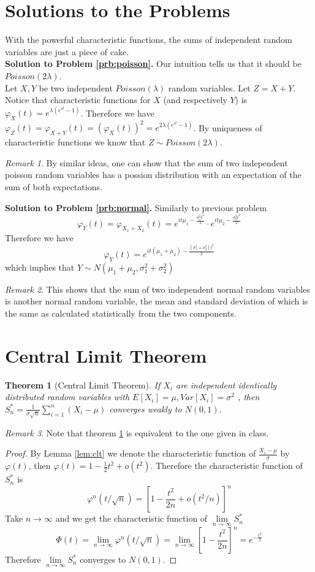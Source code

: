 \documentclass{article}
\theoremstyle{definition}
\theoremstyle{plain}
\newtheorem{theorem}{Theorem}[section]
\theoremstyle{remark}
\newtheorem*{remark}{Remark}
\begin{document}
\section{Solutions to the Problems}
With the powerful characteristic functions, the sums of independent random variables are just a piece of cake.\\
\noindent\textbf{Solution to Problem \ref{prb:poisson}.}
Our intuition tells us that it should be $Poisson(2\lambda)$. \\
Let $X,Y$ be two independent $Poisson(\lambda)$ random variables. Let $Z=X+Y$.
Notice that characteristic functions for $X$ (and respectively $Y$) is $\varphi_X(t)=e^{\lambda(e^{it}-1)}$.
Therefore we have $\varphi_Z(t)=\varphi_{X+Y}(t)=(\varphi_X(t))^2=e^{2\lambda(e^{it}-1)}$. 
By uniqueness of characteristic functions we know that $Z\sim Poisson(2\lambda)$.
\begin{remark}
	By similar ideas, one can show that the sum of two independent poisson random variables has a possion distribution with an expectation of the sum of both expectations.
\end{remark} 
\noindent\textbf{Solution to Problem \ref{prb:normal}.}
Similarly to previous problem $$\varphi_{Y}(t)=\varphi_{X_1+X_2}(t)=e^{it\mu_1-\frac{\sigma_1^2 t^2}{2}}\cdot e^{it\mu_2-\frac{\sigma_2^2 t^2}{2}}$$
Therefore we have $$\varphi_Y(t)=e^{it(\mu_1+\mu_2)-\frac{(\sigma_1^2+\sigma_2^2)t^2}{2}}$$
which implies that $Y\sim N(\mu_1+\mu_2,\sigma_1^2+\sigma_2^2)$
\begin{remark}
	This shows that the sum of two independent normal random variables is another normal random variable, the mean and standard deviation of which is the same as calculated statistically from the two components. 
\end{remark}
\section{Central Limit Theorem}
\begin{theorem}[Central Limit Theorem\cite{waterloo}]
	If $X_i$ are independent identically distributed random variables with $E[X_i] = \mu, Var[X_i] = \sigma^2$ , then $S_n^* = \frac1{\sigma\sqrt n}\sum_{i=1}^n(X_i-\mu)$ converges weakly to $N(0, 1)$.
	\label{thm:clt}
\end{theorem}
\begin{remark}
	Note that theorem \ref{thm:clt} is equivalent to the one given in class.
\end{remark}
\begin{proof}
	By Lemma \ref{lem:clt} we denote the characteristic function of $\frac{X_i-\mu}{\sigma}$ by $\varphi(t)$, then  $\varphi(t)=1-\frac12t^2+o(t^2)$. Therefore the characteristic function of $S_n^*$ is 
	$$\varphi^n(t/\sqrt{n})=[1-\frac{t^2}{2n}+o(t^2/n)]^n$$
	Take $n\to\infty$ and we get the characteristic function of $\lim\limits_{n\to\infty}S^*_n$
	$$\varPhi(t)=\lim\limits_{n\to\infty}\varphi^n(t/\sqrt{n})
	=\lim\limits_{n\to\infty}[1-\frac{t^2}{2n}]^n=e^{-\frac{t^2}2}$$
	Therefore $\lim\limits_{n\to\infty}S_n^*$ converges to $N(0,1)$.
\end{proof}
\medskip



\end{document}
